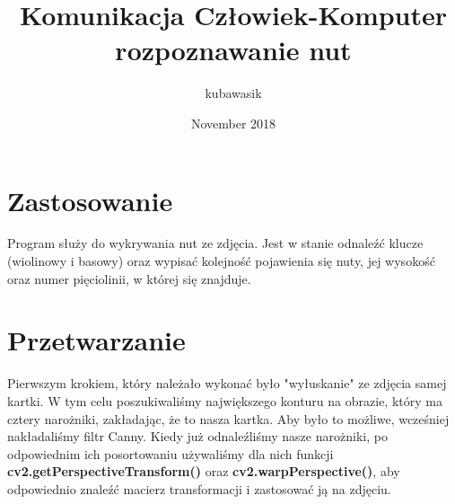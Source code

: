 \documentclass{article}
\title{Komunikacja Człowiek-Komputer \newline rozpoznawanie nut}
\author{kubawasik }
\date{November 2018}
\begin{document}
\maketitle

\section{Zastosowanie}


Program służy do wykrywania nut ze zdjęcia.
Jest w stanie odnaleźć klucze (wiolinowy i basowy) oraz wypisać kolejność pojawienia się nuty, jej wysokość oraz numer pięciolinii, w której się znajduje.  

\section{Przetwarzanie}

Pierwszym krokiem, który należało wykonać było "wyłuskanie" ze zdjęcia samej kartki. 
W tym celu poszukiwaliśmy największego konturu na obrazie, który ma cztery narożniki, zakładając, że to nasza kartka. 
Aby było to możliwe, wcześniej nakładaliśmy filtr Canny. 
Kiedy już odnaleźliśmy nasze narożniki, po odpowiednim ich posortowaniu używaliśmy dla nich funkcji \textbf{cv2.getPerspectiveTransform()}
oraz \textbf{cv2.warpPerspective()}, aby odpowiednio znaleźć macierz transformacji i zastosować ją na zdjęciu. 
\end{document}
